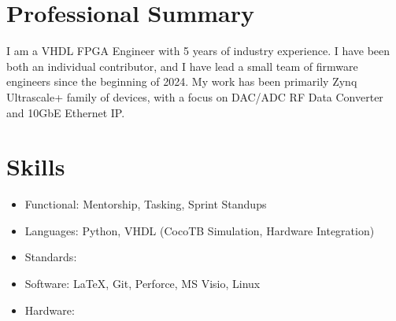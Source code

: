 \documentclass[10pt,final,sans]{resume}
\begin{document}
\setlength\headheight{28pt} %

\section{Professional Summary}
\raggedright{I am a VHDL FPGA Engineer with 5 years of industry experience. I have been both an individual contributor, and I have lead a small team of firmware engineers since the beginning of 2024. My work has been primarily Zynq Ultrascale+ family of devices, with a focus on DAC/ADC RF Data Converter and 10GbE Ethernet IP.}

\section{Skills}
\begin{itemize}
  \item Functional: Mentorship, Tasking, Sprint Standups
  \item Languages: Python, VHDL (CocoTB Simulation, Hardware Integration)
  \item Standards: 
  \item Software: {\textrm \LaTeX}, Git, Perforce, MS Visio, Linux
  \item Hardware:
\end{itemize}
\end{document}
